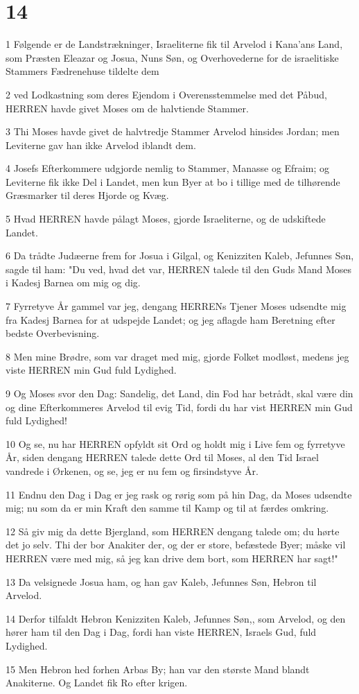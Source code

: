 \chapter{14}

\par 1 Følgende er de Landstrækninger, Israeliterne fik til Arvelod i Kana'ans Land, som Præsten Eleazar og Josua, Nuns Søn, og Overhovederne for de israelitiske Stammers Fædrenehuse tildelte dem
\par 2 ved Lodkastning som deres Ejendom i Overensstemmelse med det Påbud, HERREN havde givet Moses om de halvtiende Stammer.
\par 3 Thi Moses havde givet de halvtredje Stammer Arvelod hinsides Jordan; men Leviterne gav han ikke Arvelod iblandt dem.
\par 4 Josefs Efterkommere udgjorde nemlig to Stammer, Manasse og Efraim; og Leviterne fik ikke Del i Landet, men kun Byer at bo i tillige med de tilhørende Græsmarker til deres Hjorde og Kvæg.
\par 5 Hvad HERREN havde pålagt Moses, gjorde Israeliterne, og de udskiftede Landet.
\par 6 Da trådte Judæerne frem for Josua i Gilgal, og Kenizziten Kaleb, Jefunnes Søn, sagde til ham: "Du ved, hvad det var, HERREN talede til den Guds Mand Moses i Kadesj Barnea om mig og dig.
\par 7 Fyrretyve År gammel var jeg, dengang HERRENs Tjener Moses udsendte mig fra Kadesj Barnea for at udspejde Landet; og jeg aflagde ham Beretning efter bedste Overbevisning.
\par 8 Men mine Brødre, som var draget med mig, gjorde Folket modløst, medens jeg viste HERREN min Gud fuld Lydighed.
\par 9 Og Moses svor den Dag: Sandelig, det Land, din Fod har betrådt, skal være din og dine Efterkommeres Arvelod til evig Tid, fordi du har vist HERREN min Gud fuld Lydighed!
\par 10 Og se, nu har HERREN opfyldt sit Ord og holdt mig i Live fem og fyrretyve År, siden dengang HERREN talede dette Ord til Moses, al den Tid Israel vandrede i Ørkenen, og se, jeg er nu fem og firsindstyve År.
\par 11 Endnu den Dag i Dag er jeg rask og rørig som på hin Dag, da Moses udsendte mig; nu som da er min Kraft den samme til Kamp og til at færdes omkring.
\par 12 Så giv mig da dette Bjergland, som HERREN dengang talede om; du hørte det jo selv. Thi der bor Anakiter der, og der er store, befæstede Byer; måske vil HERREN være med mig, så jeg kan drive dem bort, som HERREN har sagt!"
\par 13 Da velsignede Josua ham, og han gav Kaleb, Jefunnes Søn, Hebron til Arvelod.
\par 14 Derfor tilfaldt Hebron Kenizziten Kaleb, Jefunnes Søn,, som Arvelod, og den hører ham til den Dag i Dag, fordi han viste HERREN, Israels Gud, fuld Lydighed.
\par 15 Men Hebron hed forhen Arbas By; han var den største Mand blandt Anakiterne. Og Landet fik Ro efter krigen.

